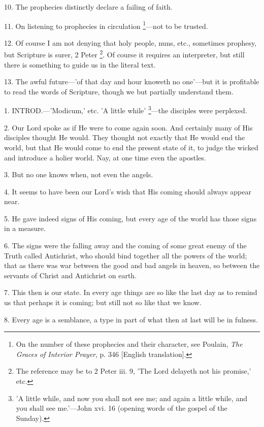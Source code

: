 10. The prophecies distinctly declare a failing
of faith.

11. On listening to prophecies in circulation \footnote{On the number of these
prophecies and their character, see Poulain, \emph{The Graces of Interior
Prayer}, p. 346 [English translation].}—not to be trusted.

12. Of course I am not denying that holy people,
nuns, etc., sometimes prophesy, but Scripture is surer, 2 Peter \footnote{The reference may be to 2
Peter iii. 9, 'The Lord delayeth not his promise,' etc.}. Of course it requires an interpreter, but still there is
something to guide us in the literal text.

13. The awful future—'of that day and hour
knoweth no one'—but it is profitable to read the words of Scripture,
though we but partially understand them.


1. INTROD.—'Modicum,'
etc. 'A little while' \footnote{'A little while, and now
you shall not see me; and again a little while, and you shall see
me.'—John xvi. 16 (opening words of the gospel of the Sunday).}—the
disciples were perplexed.

2. Our Lord spoke as if He were to come again
soon. And certainly many of His disciples thought He would. They
thought not exactly that He would end the world, but that He would
come to end the present state of it, to judge the wicked and introduce
a holier world. Nay, at one time even the apostles.

3. But no one knows when, not even the angels.

4. It seems to have been our Lord's wish that His
coming should always appear near.

5. He gave indeed signs of His coming, but every
age of the world has those signs in a measure.

6. The signs were the falling away and the coming
of some great enemy of the Truth called Antichrist, who should bind
together all the powers of the world; that as there was war between
the good and bad angels in heaven, so between the servants of Christ
and Antichrist on earth.

7. This then is our state. In every age things
are so like the last day as to remind us that perhaps it is coming;
but still not so like that we know.

8. Every age is a semblance, a type in part of
what then at last will be in fulness.

